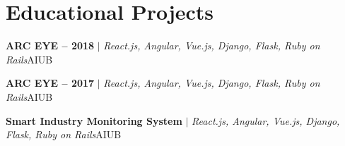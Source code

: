 \section{Educational Projects}
\resumeSubHeadingListStart
\resumeProjectHeading
{\textbf{ARC EYE -- 2018} $|$ \emph{React.js, Angular, Vue.js, Django, Flask, Ruby on Rails}}{AIUB}

\resumeProjectHeading
{\textbf{ARC EYE -- 2017} $|$ \emph{React.js, Angular, Vue.js, Django, Flask, Ruby on Rails}}{AIUB}

\resumeProjectHeading
{\textbf{Smart Industry Monitoring System} $|$ \emph{React.js, Angular, Vue.js, Django, Flask, Ruby on Rails}}{AIUB}

\resumeSubHeadingListEnd